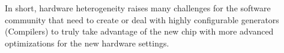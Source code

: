 


 








In short, hardware heterogeneity raises many challenges for the software community that need to create or deal with highly configurable generators (\ie Compilers) to truly take advantage of the new chip with more advanced optimizations for the new hardware settings.

